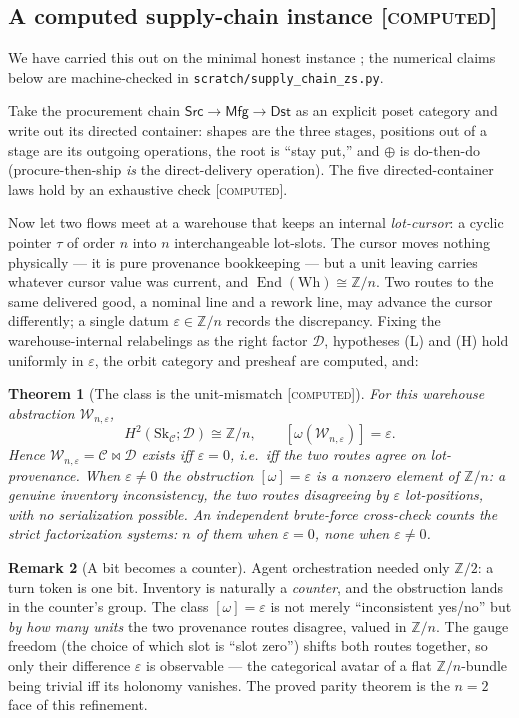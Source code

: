 \documentclass[11pt]{article}
\newtheorem{theorem}{Theorem}
\theoremstyle{definition}
\newtheorem{remark}[theorem]{Remark}
\newcommand{\End}{\operatorname{End}}
\newcommand{\C}{\mathcal{C}}
\newcommand{\D}{\mathcal{D}}
\newcommand{\W}{\mathcal{W}}
\newcommand{\Sk}{\mathrm{Sk}}
\newcommand{\Zn}{\mathbb{Z}/n}
\newcommand{\Ztwo}{\mathbb{Z}/2}
\newcommand{\gComputed}{\textsc{[computed]}}
\begin{document}
\subsection{A computed supply-chain instance \gComputed}
We have carried this out on the minimal honest instance \cite{supplyzs}; the numerical claims
below are machine-checked in \texttt{scratch/supply\_chain\_zs.py}.

Take the procurement chain $\mathsf{Src}\to\mathsf{Mfg}\to\mathsf{Dst}$ as an explicit poset
category and write out its directed container: shapes are the three stages, positions out of
a stage are its outgoing operations, the root is ``stay put,'' and $\oplus$ is do-then-do
(procure-then-ship \emph{is} the direct-delivery operation). The five directed-container laws
hold by an exhaustive check \gComputed.

Now let two flows meet at a warehouse that keeps an internal \emph{lot-cursor}: a cyclic
pointer $\tau$ of order $n$ into $n$ interchangeable lot-slots. The cursor moves nothing
physically --- it is pure provenance bookkeeping --- but a unit leaving carries whatever
cursor value was current, and $\End(\mathrm{Wh})\cong\Zn$. Two routes to the same delivered
good, a nominal line and a rework line, may advance the cursor differently; a single datum
$\varepsilon\in\Zn$ records the discrepancy. Fixing the warehouse-internal relabelings as the
right factor $\D$, hypotheses (L) and (H) hold uniformly in $\varepsilon$, the orbit category
and presheaf are computed, and:

\begin{theorem}[The class is the unit-mismatch \cite{supplyzs} \gComputed]\label{thm:sc}
For this warehouse abstraction $\W_{n,\varepsilon}$,
\[
   H^2(\Sk_\C;\D)\cong\Zn,\qquad
   [\omega(\W_{n,\varepsilon})]=\varepsilon .
\]
Hence $\W_{n,\varepsilon}=\C\bowtie\D$ exists iff $\varepsilon=0$, i.e.\ iff the two routes
agree on lot-provenance. When $\varepsilon\neq0$ the obstruction $[\omega]=\varepsilon$ is a
nonzero element of $\Zn$: a genuine inventory inconsistency, the two routes disagreeing by
$\varepsilon$ lot-positions, with no serialization possible. An independent brute-force
cross-check counts the strict factorization systems: $n$ of them when $\varepsilon=0$, none
when $\varepsilon\neq0$.
\end{theorem}

\begin{remark}[A bit becomes a counter]\label{rmk:zn}
Agent orchestration \cite{orch} needed only $\Ztwo$: a turn token is one bit. Inventory is
naturally a \emph{counter}, and the obstruction lands in the counter's group. The class
$[\omega]=\varepsilon$ is not merely ``inconsistent yes/no'' but \emph{by how many units} the
two provenance routes disagree, valued in $\Zn$. The gauge freedom (the choice of which slot
is ``slot zero'') shifts both routes together, so only their difference $\varepsilon$ is
observable --- the categorical avatar of a flat $\Zn$-bundle being trivial iff its holonomy
vanishes. The proved parity theorem is the $n=2$ face of this refinement.
\end{remark}
\end{document}
